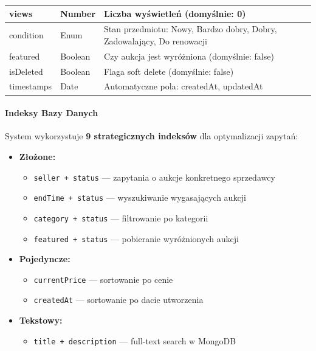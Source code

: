 \begin{longtable}{|p{3.5cm}|p{2.5cm}|p{8cm}|}
  views         & Number          & Liczba wyświetleń (domyślnie: 0)                                                                                                                              \\ \hline
  condition     & Enum            & Stan przedmiotu: Nowy, Bardzo dobry, Dobry, Zadowalający, Do renowacji                                                                                        \\ \hline
  featured      & Boolean         & Czy aukcja jest wyróżniona (domyślnie: false)                                                                                                                 \\ \hline
  isDeleted     & Boolean         & Flaga soft delete (domyślnie: false)                                                                                                                          \\ \hline
  timestamps    & Date            & Automatyczne pola: createdAt, updatedAt                                                                                                                       \\ \hline
\end{longtable}

\paragraph{Indeksy Bazy Danych}

System wykorzystuje \textbf{9 strategicznych indeksów} dla optymalizacji zapytań:

\begin{itemize}
  \item \textbf{Złożone:}
        \begin{itemize}
          \item \texttt{seller + status} --- zapytania o aukcje konkretnego sprzedawcy
          \item \texttt{endTime + status} --- wyszukiwanie wygasających aukcji
          \item \texttt{category + status} --- filtrowanie po kategorii
          \item \texttt{featured + status} --- pobieranie wyróżnionych aukcji
        \end{itemize}
  \item \textbf{Pojedyncze:}
        \begin{itemize}
          \item \texttt{currentPrice} --- sortowanie po cenie
          \item \texttt{createdAt} --- sortowanie po dacie utworzenia
        \end{itemize}
  \item \textbf{Tekstowy:}
        \begin{itemize}
          \item \texttt{title + description} --- full-text search w MongoDB
        \end{itemize}
\end{itemize}

